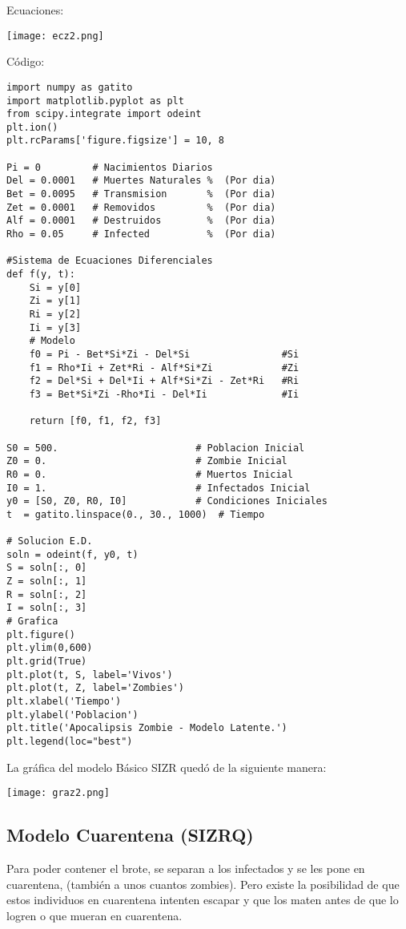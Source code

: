 \documentclass[12pt,letterpaper]{article}
\begin{document}
Ecuaciones:
\begin{center}
\texttt{[image: ecz2.png]}
\end{center}

C\'odigo: 
\begin{verbatim}
import numpy as gatito
import matplotlib.pyplot as plt
from scipy.integrate import odeint
plt.ion()
plt.rcParams['figure.figsize'] = 10, 8

Pi = 0         # Nacimientos Diarios
Del = 0.0001   # Muertes Naturales %  (Por dia)
Bet = 0.0095   # Transmision       %  (Por dia)
Zet = 0.0001   # Removidos         %  (Por dia)
Alf = 0.0001   # Destruidos        %  (Por dia)
Rho = 0.05     # Infected          %  (Por dia)

#Sistema de Ecuaciones Diferenciales 
def f(y, t):
    Si = y[0]
    Zi = y[1]
    Ri = y[2]
    Ii = y[3]
    # Modelo
    f0 = Pi - Bet*Si*Zi - Del*Si                #Si
    f1 = Rho*Ii + Zet*Ri - Alf*Si*Zi            #Zi
    f2 = Del*Si + Del*Ii + Alf*Si*Zi - Zet*Ri   #Ri
    f3 = Bet*Si*Zi -Rho*Ii - Del*Ii             #Ii
    
    return [f0, f1, f2, f3]

S0 = 500.                        # Poblacion Inicial
Z0 = 0.                          # Zombie Inicial
R0 = 0.                          # Muertos Inicial
I0 = 1.                          # Infectados Inicial
y0 = [S0, Z0, R0, I0]            # Condiciones Iniciales
t  = gatito.linspace(0., 30., 1000)  # Tiempo

# Solucion E.D.
soln = odeint(f, y0, t)
S = soln[:, 0]
Z = soln[:, 1]
R = soln[:, 2]
I = soln[:, 3]
# Grafica
plt.figure()
plt.ylim(0,600)
plt.grid(True)
plt.plot(t, S, label='Vivos')
plt.plot(t, Z, label='Zombies')
plt.xlabel('Tiempo')
plt.ylabel('Poblacion')
plt.title('Apocalipsis Zombie - Modelo Latente.')
plt.legend(loc="best")
\end{verbatim}

\newpage
La gr\'afica del modelo B\'asico SIZR qued\'o de la siguiente manera:

\begin{center}
\texttt{[image: graz2.png]} 
\end{center}

\subsection*{Modelo Cuarentena (SIZRQ)}
Para poder contener el brote, se separan a los infectados y se les pone en cuarentena, (tambi\'en a unos cuantos zombies). Pero existe la posibilidad de que estos individuos en cuarentena intenten escapar y que los maten antes de que lo logren o que mueran en cuarentena. 
\end{document}
